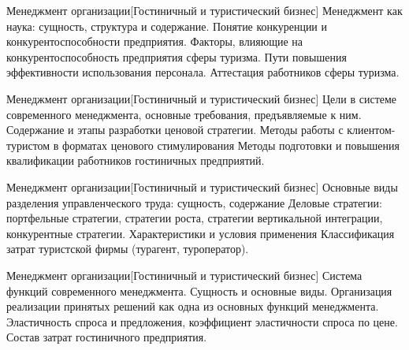 \documentclass[
	11pt,
	a4paper,
	]
	{article}
\begin{document}
\vfill



\begin{minipage}[t][\miniH]{\miniL}\centering
	 {Менеджмент организации}[Гостиничный и туристический бизнес]
		{
			Менеджмент как наука: сущность, структура и содержание.
		}{
			Понятие конкуренции и конкурентоспособности предприятия. Факторы, влияющие на конкурентоспособность предприятия сферы туризма.
		}{
			Пути повышения эффективности использования персонала. Аттестация работников сферы туризма.
		}
	\lowGE
\end{minipage}

\vfill



\begin{minipage}[t][\miniH]{\miniL}\centering
	 {Менеджмент организации}[Гостиничный и туристический бизнес]
		{
			Цели в системе современного менеджмента, основные требования, предъявляемые к ним.
		}{
			Содержание и этапы разработки ценовой стратегии. Методы работы с клиентом-туристом в форматах ценового стимулирования
		}{
			Методы подготовки и повышения квалификации работников гостиничных предприятий.
		}
	\lowGE
\end{minipage}





\begin{minipage}[t][\miniH]{\miniL}\centering
	 {Менеджмент организации}[Гостиничный и туристический бизнес]
		{
			Основные виды разделения управленческого труда: сущность, содержание
		}{
			Деловые стратегии: портфельные стратегии, стратегии роста, стратегии вертикальной интеграции, конкурентные стратегии. Характеристики и условия применения
		}{
			Классификация затрат туристской фирмы (турагент, туроператор).
		}
	\lowGE
\end{minipage}

\vfill



\begin{minipage}[t][\miniH]{\miniL}\centering
	 {Менеджмент организации}[Гостиничный и туристический бизнес]
		{
			Система функций современного менеджмента. Сущность и основные виды. Организация реализации принятых решений как одна из основных функций менеджмента.
		}{
			Эластичность спроса и предложения, коэффициент эластичности спроса по цене.
		}{
			Состав затрат гостиничного предприятия.
		}
	\lowGE
\end{minipage}
\end{document}

